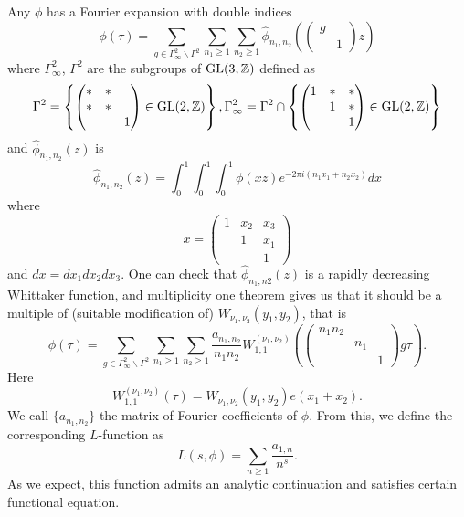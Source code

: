 Any $\phi$ has a Fourier expansion with double indices
$$
\phi(\tau) = \sum_{g\in \Gamma_{\infty}^{2}\backslash \Gamma^{2}}\sum_{n_{1} \geq 1} \sum_{n_{2}\geq 1} \hat{\phi}_{n_{1}, n_{2}}\left(\begin{pmatrix} g & \\ & 1 \end{pmatrix}z\right)
$$
where $\Gamma_{\infty}^{2}$, $\Gamma^{2}$ are the subgroups of $\operatorname{\mathrm{GL}}(3, \mathbb{Z})$ defined as
$$
\Gamma^{2} = \left\{\begin{pmatrix}
* & * & \\ * & * & \\ & & 1
\end{pmatrix} \in \operatorname{\mathrm{GL}}(2, \mathbb{Z})\right\}, \Gamma_{\infty}^{2} = \Gamma^{2} \cap \left\{\begin{pmatrix}
1 & * & * \\ & 1 & * \\ & & 1
\end{pmatrix} \in \operatorname{\mathrm{GL}}(2, \mathbb{Z})\right\}
$$
and $\hat{\phi}_{n_{1}, n_{2}}(z)$ is 
$$
\hat{\phi}_{n_{1}, n_{2}}(z) = \int_{0}^{1}\int_{0}^{1} \int_{0}^{1} \phi(xz) e^{-2\pi i (n_{1}x_{1} + n_{2}x_{2})} dx
$$
where
$$
x = \begin{pmatrix}
1 & x_{2} & x_{3} \\ & 1 & x_{1} \\ & & 1
\end{pmatrix}
$$
and $dx = dx_{1}dx_{2}dx_{3}$.
One can check that $\hat{\phi}_{n_{1}, n{2}}(z)$ is a rapidly decreasing Whittaker function, and multiplicity one theorem gives us that it should be a multiple of (suitable modification of) $W_{\nu_{1}, \nu_{2}}(y_{1}, y_{2})$, that is
$$
\phi(\tau) = \sum_{g\in \Gamma_{\infty}^{2}\backslash \Gamma^{2}}\sum_{n_{1} \geq 1} \sum_{n_{2}\geq 1} \frac{a_{n_{1}, n_{2}}}{n_{1}n_{2}} W_{1, 1}^{(\nu_1, \nu_2)}\left(\begin{pmatrix}
n_{1}n_{2} & & \\ & n_{1} & \\ & & 1
\end{pmatrix} g\tau \right).
$$
Here
$$
W_{1, 1}^{(\nu_{1}, \nu_{2})}(\tau) = W_{\nu_{1},\nu_{2}}(y_{1}, y_{2}) e(x_{1} + x_{2}).
$$
We call $\{a_{n_{1}, n_{2}}\}$ the matrix of Fourier coefficients of $\phi$.
From this, we define the corresponding $L$-function as
$$
L(s,\phi) = \sum_{n \geq 1} \frac{a_{1, n}}{n^{s}}.
$$
As we expect, this function admits an analytic continuation and satisfies certain functional equation.
